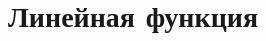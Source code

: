 \documentclass[10pt, a4paper]{article}
\begin{document}
		

\section{Линейная функция}
\begin{enumerate}
	

\end{enumerate}
\end{document}
